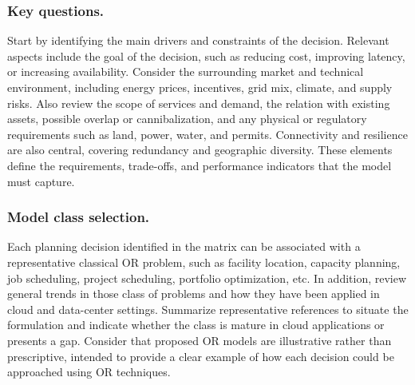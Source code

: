 \documentclass[pdflatex,sn-mathphys-num]{sn-jnl}
\theoremstyle{thmstyleone}
\theoremstyle{thmstyletwo}
\theoremstyle{thmstylethree}
\begin{document}
\subsubsection{Key questions.}
Start by identifying the main drivers and constraints of the decision. Relevant aspects include the goal of the decision, such as reducing cost, improving latency, or increasing availability. Consider the surrounding market and technical environment, including energy prices, incentives, grid mix, climate, and supply risks. Also review the scope of services and demand, the relation with existing assets, possible overlap or cannibalization, and any physical or regulatory requirements such as land, power, water, and permits. Connectivity and resilience are also central, covering redundancy and geographic diversity. These elements define the requirements, trade-offs, and performance indicators that the model must capture.

\subsubsection{Model class selection.}

Each planning decision identified in the matrix can be associated with a representative classical OR problem, such as facility location, capacity planning, job scheduling, project scheduling, portfolio optimization, etc.  
In addition, review general trends in those class of problems and how they have been applied in cloud and data-center settings. Summarize representative references to situate the formulation and indicate whether the class is mature in cloud applications or presents a gap. Consider that proposed OR models are illustrative rather than prescriptive, intended to provide a clear example of how each decision could be approached using OR techniques. 
\end{document}
